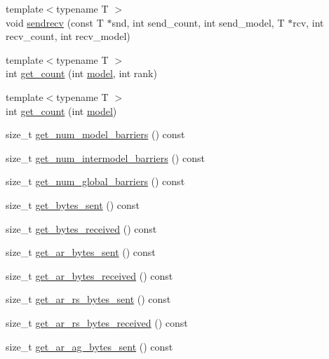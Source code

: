 \begin{DoxyCompactItemize}
\item 
{\footnotesize template$<$typename T $>$ }\\void \hyperlink{classlbann_1_1lbann__comm_a61e8479f25d209be238f1b61115f7a0d}{sendrecv} (const T $\ast$snd, int send\+\_\+count, int send\+\_\+model, T $\ast$rcv, int recv\+\_\+count, int recv\+\_\+model)
\item 
{\footnotesize template$<$typename T $>$ }\\int \hyperlink{classlbann_1_1lbann__comm_aa1db618eb587ead21fb0420bf94bfd45}{get\+\_\+count} (int \hyperlink{classlbann_1_1model}{model}, int rank)
\item 
{\footnotesize template$<$typename T $>$ }\\int \hyperlink{classlbann_1_1lbann__comm_a54544a1b1a691fa7b6314da5682f184c}{get\+\_\+count} (int \hyperlink{classlbann_1_1model}{model})
\item 
size\+\_\+t \hyperlink{classlbann_1_1lbann__comm_ab07201c12c01f065acb151f2a3c32efa}{get\+\_\+num\+\_\+model\+\_\+barriers} () const
\item 
size\+\_\+t \hyperlink{classlbann_1_1lbann__comm_a78ea2f289eb8de66edecb84b6cf48b84}{get\+\_\+num\+\_\+intermodel\+\_\+barriers} () const
\item 
size\+\_\+t \hyperlink{classlbann_1_1lbann__comm_ad5a4f05dc5a2c992ebb659650a7dc6ce}{get\+\_\+num\+\_\+global\+\_\+barriers} () const
\item 
size\+\_\+t \hyperlink{classlbann_1_1lbann__comm_afe3d3d12c544b43c478b968ef4226561}{get\+\_\+bytes\+\_\+sent} () const
\item 
size\+\_\+t \hyperlink{classlbann_1_1lbann__comm_aadc407cd170fc9da46cdc4483f424b2a}{get\+\_\+bytes\+\_\+received} () const
\item 
size\+\_\+t \hyperlink{classlbann_1_1lbann__comm_ae0be48a03e4e8af43929c97a31a8f361}{get\+\_\+ar\+\_\+bytes\+\_\+sent} () const
\item 
size\+\_\+t \hyperlink{classlbann_1_1lbann__comm_a1b7c53c7c8e04543e1a262a01d847976}{get\+\_\+ar\+\_\+bytes\+\_\+received} () const
\item 
size\+\_\+t \hyperlink{classlbann_1_1lbann__comm_a7b9827e5f46d535c8ab2cf2f6c576291}{get\+\_\+ar\+\_\+rs\+\_\+bytes\+\_\+sent} () const
\item 
size\+\_\+t \hyperlink{classlbann_1_1lbann__comm_a4ed37b23401cd6df6502229bae0e5a1d}{get\+\_\+ar\+\_\+rs\+\_\+bytes\+\_\+received} () const
\item 
size\+\_\+t \hyperlink{classlbann_1_1lbann__comm_af745b91711014bf5a9f8d2466b5a6634}{get\+\_\+ar\+\_\+ag\+\_\+bytes\+\_\+sent} () const

\end{DoxyCompactItemize}
